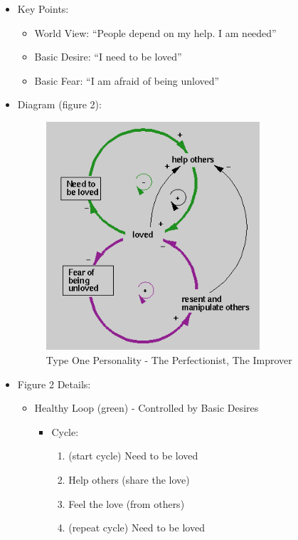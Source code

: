 \documentclass[openleft,oneside,showtrims]{memoir}
\begin{document}
\begin{itemize}
\item Key Points:
\label{sec:org02934a4}
\begin{itemize}
\item World View: ``People depend on my help. I am needed''
\item Basic Desire: ``I need to be loved''
\item Basic Fear: ``I am afraid of being unloved''
\end{itemize}

\item Diagram (figure 2):
\label{sec:org4aa6cee}

\begin{figure}[htbp]
\centering
\includegraphics[width=300px]{./media/Type-2-Perfectionist.png}
\caption{\label{fig:002}Type One Personality - The Perfectionist, The Improver}
\end{figure}

\item Figure 2 Details:
\label{sec:orgb6c13cc}

\begin{itemize}
\item Healthy Loop (green) - Controlled by Basic Desires
\label{sec:orga7791aa}

\begin{itemize}
\item Cycle: 
\begin{enumerate}
\item (start cycle) Need to be loved
\item Help others (share the love)
\item Feel the love (from others)
\item (repeat cycle) Need to be loved
\end{enumerate}
\end{itemize}


\end{itemize}
\end{itemize}
\end{document}
